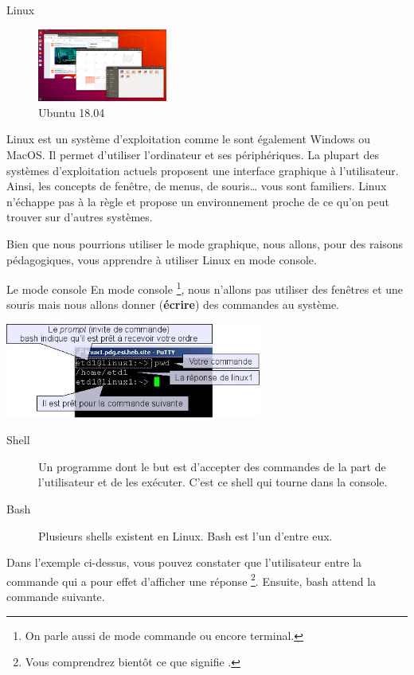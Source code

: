 \documentclass[a4paper,11pt]{style-esi/td}
\begin{document}
		\begin{theorie}{Linux}
			\begin{figure} 
				\vspace{-1em}
				\flushright
				\includegraphics[width=0.38\textwidth]{images/ubuntu}
				\caption{Ubuntu 18.04}
				\vspace{-1em}
			\end{figure} 
			Linux est un système d'exploitation comme le sont également Windows ou MacOS. 
			Il permet d'utiliser l'ordinateur et ses périphériques. 
			La plupart des systèmes d'exploitation actuels proposent 
			une interface graphique à l'utilisateur. 
			Ainsi, les concepts de fenêtre, de menus, de souris\dots{} vous sont familiers. 
			Linux n'échappe pas à la règle et propose un environnement 
			proche de ce qu'on peut trouver sur d'autres systèmes.
		\end{theorie}

		Bien que nous pourrions utiliser le mode graphique, 
		nous allons, pour des raisons pédagogiques, 
		vous apprendre à utiliser Linux en mode console.

		\begin{theorie}{Le mode console}
			En mode console%
			\footnote{%
				On parle aussi de mode \og{}commande\fg{} ou encore \og{}terminal\fg{}.
			}, 
			nous n'allons pas utiliser des fenêtres et une souris 
			mais nous allons donner (\textbf{écrire}) des commandes au système.
			
			\medskip
			\begin{center}
			\includegraphics[width=0.63\textwidth]{images/console}
			\end{center}
			\begin{description}
			\item[Shell] 
				Un programme dont le but 
				est d'accepter des commandes de la part de l'utilisateur 
				et de les exécuter. 
				C'est ce shell qui tourne dans la console.
			\item[Bash] 
				Plusieurs shells existent en Linux. Bash est l'un d'entre eux.
			\end{description} 
			Dans l'exemple ci-dessus, 
			vous pouvez constater que l'utilisateur entre la commande   
			qui a pour effet d'afficher une réponse%
			\footnote{%
				Vous comprendrez bientôt ce que signifie .
			}. 
			Ensuite, bash attend la commande suivante.
		\end{theorie}
\end{document}
